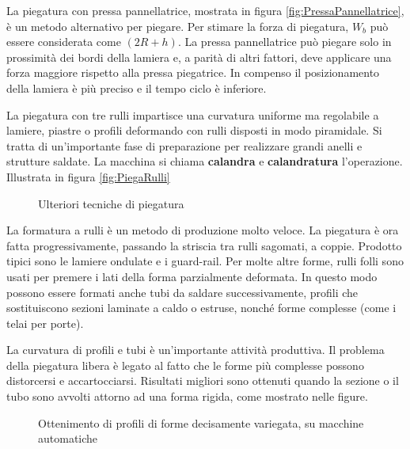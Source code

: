 La piegatura con pressa pannellatrice, mostrata in figura \ref{fig:PressaPannellatrice}, è un metodo alternativo per piegare. Per stimare la forza di piegatura, $W_b$ può essere considerata come $(2R + h)$. La pressa pannellatrice può piegare solo in prossimità dei bordi della lamiera e, a parità di altri fattori, deve applicare una forza maggiore rispetto alla pressa piegatrice. In compenso il posizionamento della lamiera è più preciso e il tempo ciclo è inferiore.

La piegatura con tre rulli impartisce una curvatura uniforme ma regolabile a lamiere, piastre o profili deformando con rulli disposti in modo piramidale. Si tratta di un'importante fase di preparazione per realizzare grandi anelli e strutture saldate. La macchina si chiama \textbf{calandra} e \textbf{calandratura} l’operazione.
Illustrata in figura \ref{fig:PiegaRulli}

\begin{figure}
\centering
{}\quad
{}
\caption{Ulteriori tecniche di piegatura}
\label{fig:TecPiega}
\end{figure}

La formatura a rulli è un metodo di produzione molto veloce. La piegatura è ora fatta progressivamente, passando la striscia tra rulli sagomati, a coppie. Prodotto tipici sono le lamiere ondulate e i guard-rail.
Per molte altre forme, rulli folli sono usati per premere i lati della forma parzialmente deformata.
In questo modo possono essere formati anche tubi da saldare successivamente, profili che sostituiscono sezioni laminate a caldo o estruse, nonché forme complesse (come i telai per porte).

La curvatura di profili e tubi è un'importante attività produttiva. Il problema della piegatura libera è legato al fatto che le forme più complesse possono distorcersi e accartocciarsi. Risultati migliori sono ottenuti quando la sezione o il tubo sono avvolti attorno ad una forma rigida, come mostrato nelle figure.

\begin{figure}
\centering
{}\quad
{}\quad
{}
\caption{Ottenimento di profili di forme decisamente variegata, su macchine automatiche}
\label{fig:PiegaAuto}
\end{figure}

